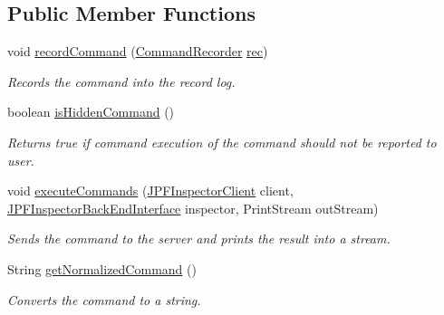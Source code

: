 \subsection*{Public Member Functions}
\begin{DoxyCompactItemize}
\item 
void \hyperlink{classgov_1_1nasa_1_1jpf_1_1inspector_1_1client_1_1_client_command_ae0670332ec750bc5b9016d0b04d8adfe}{record\+Command} (\hyperlink{classgov_1_1nasa_1_1jpf_1_1inspector_1_1client_1_1_command_recorder}{Command\+Recorder} \hyperlink{classgov_1_1nasa_1_1jpf_1_1inspector_1_1client_1_1_client_command_af4246f2427035c72a6af45a2c61361f7}{rec})
\begin{DoxyCompactList}\small\item\em Records the command into the record log. \end{DoxyCompactList}\item 
boolean \hyperlink{classgov_1_1nasa_1_1jpf_1_1inspector_1_1client_1_1_client_command_afb09c400c64e2d8e01059b91ff847761}{is\+Hidden\+Command} ()
\begin{DoxyCompactList}\small\item\em Returns true if command execution of the command should not be reported to user. \end{DoxyCompactList}\item 
void \hyperlink{interfacegov_1_1nasa_1_1jpf_1_1inspector_1_1client_1_1_client_command_interface_a6cf0905afd7822cee3268e286a7dcdd0}{execute\+Commands} (\hyperlink{classgov_1_1nasa_1_1jpf_1_1inspector_1_1client_1_1_j_p_f_inspector_client}{J\+P\+F\+Inspector\+Client} client, \hyperlink{interfacegov_1_1nasa_1_1jpf_1_1inspector_1_1interfaces_1_1_j_p_f_inspector_back_end_interface}{J\+P\+F\+Inspector\+Back\+End\+Interface} inspector, Print\+Stream out\+Stream)
\begin{DoxyCompactList}\small\item\em Sends the command to the server and prints the result into a stream. \end{DoxyCompactList}\item 
String \hyperlink{interfacegov_1_1nasa_1_1jpf_1_1inspector_1_1client_1_1_client_command_interface_a393044f5be05c3ab3451b72aeff7af62}{get\+Normalized\+Command} ()
\begin{DoxyCompactList}\small\item\em Converts the command to a string. \end{DoxyCompactList}\end{DoxyCompactItemize}
